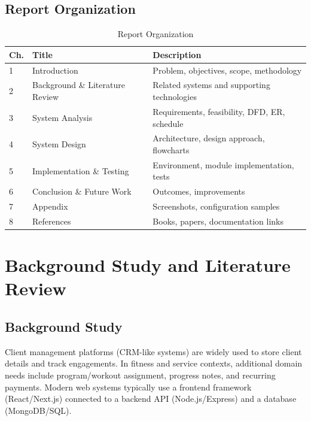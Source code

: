 \documentclass[12pt,a4paper]{report}
\begin{document}
\section{Report Organization}
\begin{table}[h]
\centering
\caption{Report Organization}
\begin{tabular}{@{}p{1.2cm}p{4.0cm}p{7.8cm}@{}}
\toprule
\textbf{Ch.} & \textbf{Title} & \textbf{Description} \\
\midrule
1 & Introduction & Problem, objectives, scope, methodology \\
2 & Background \& Literature Review & Related systems and supporting technologies \\
3 & System Analysis & Requirements, feasibility, DFD, ER, schedule \\
4 & System Design & Architecture, design approach, flowcharts \\
5 & Implementation \& Testing & Environment, module implementation, tests \\
6 & Conclusion \& Future Work & Outcomes, improvements \\
7 & Appendix & Screenshots, configuration samples \\
8 & References & Books, papers, documentation links \\
\bottomrule
\end{tabular}
\end{table}

\chapter{Background Study and Literature Review}
\section{Background Study}
Client management platforms (CRM-like systems) are widely used to store client details and track engagements. In fitness and service contexts, additional domain needs include program/workout assignment, progress notes, and recurring payments. Modern web systems typically use a frontend framework (React/Next.js) connected to a backend API (Node.js/Express) and a database (MongoDB/SQL).
\end{document}
